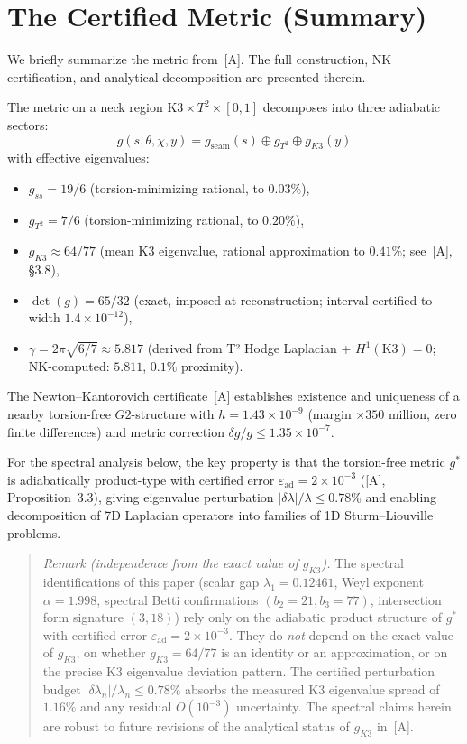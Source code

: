 \documentclass[11pt,a4paper]{article}
\newcommand{\Gtwo}{\mathrm{G}_2}
\def\Gtwo{G2}%
\begin{document}
\section{The Certified Metric (Summary)}

We briefly summarize the metric from~[A]. The full construction, NK certification, and analytical decomposition are presented therein.

The metric on a neck region $\mathrm{K3} \times T^2 \times [0,1]$ decomposes into three adiabatic sectors:
\begin{equation}
g(s, \theta, \chi, y) = g_{\mathrm{seam}}(s) \oplus g_{T^2} \oplus g_{K3}(y)
\end{equation}
with effective eigenvalues:
\begin{itemize}
\item $g_{ss} = 19/6$ (torsion-minimizing rational, to $0.03\%$),
\item $g_{T^2} = 7/6$ (torsion-minimizing rational, to $0.20\%$),
\item $g_{K3} \approx 64/77$ (mean K3 eigenvalue, rational approximation to $0.41\%$; see~[A], §3.8),
\item $\det(g) = 65/32$ (exact, imposed at reconstruction; interval-certified to width $1.4 \times 10^{-12}$),
\item $\gamma = 2\pi\sqrt{6/7} \approx 5.817$ (derived from T² Hodge Laplacian + $H^1(\mathrm{K3})=0$; NK-computed: $5.811$, $0.1\%$ proximity).
\end{itemize}

The Newton--Kantorovich certificate~[A] establishes existence and uniqueness of a nearby torsion-free $\Gtwo$-structure with $h = 1.43 \times 10^{-9}$ (margin $\times 350$ million, zero finite differences) and metric correction $\delta g/g \leq 1.35 \times 10^{-7}$.

For the spectral analysis below, the key property is that the torsion-free metric $g^*$ is adiabatically product-type with certified error $\varepsilon_{\mathrm{ad}} = 2 \times 10^{-3}$ ([A], Proposition~3.3), giving eigenvalue perturbation $|\delta\lambda|/\lambda \leq 0.78\%$ and enabling decomposition of 7D Laplacian operators into families of 1D Sturm--Liouville problems.

\begin{quote}
\emph{Remark (independence from the exact value of $g_{K3}$).} The spectral identifications of this paper (scalar gap $\lambda_1 = 0.12461$, Weyl exponent $\alpha = 1.998$, spectral Betti confirmations $(b_2 = 21, b_3 = 77)$, intersection form signature $(3, 18)$) rely only on the adiabatic product structure of $g^*$ with certified error $\varepsilon_{\mathrm{ad}} = 2 \times 10^{-3}$. They do \emph{not} depend on the exact value of $g_{K3}$, on whether $g_{K3} = 64/77$ is an identity or an approximation, or on the precise K3 eigenvalue deviation pattern. The certified perturbation budget $|\delta\lambda_n|/\lambda_n \leq 0.78\%$ absorbs the measured K3 eigenvalue spread of $1.16\%$ and any residual $O(10^{-3})$ uncertainty. The spectral claims herein are robust to future revisions of the analytical status of $g_{K3}$ in~[A].
\end{quote}
\end{document}
